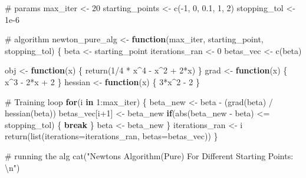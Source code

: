 \documentclass[
  letterpaper,
  DIV=11,
  numbers=noendperiod]{scrartcl}
\newenvironment{Shaded}{\begin{snugshade}}{\end{snugshade}}
\newcommand{\AttributeTok}[1]{\textcolor[rgb]{0.40,0.45,0.13}{#1}}
\newcommand{\CommentTok}[1]{\textcolor[rgb]{0.37,0.37,0.37}{#1}}
\newcommand{\ControlFlowTok}[1]{\textcolor[rgb]{0.00,0.23,0.31}{\textbf{#1}}}
\newcommand{\DecValTok}[1]{\textcolor[rgb]{0.68,0.00,0.00}{#1}}
\newcommand{\FloatTok}[1]{\textcolor[rgb]{0.68,0.00,0.00}{#1}}
\newcommand{\FunctionTok}[1]{\textcolor[rgb]{0.28,0.35,0.67}{#1}}
\newcommand{\NormalTok}[1]{\textcolor[rgb]{0.00,0.23,0.31}{#1}}
\newcommand{\OtherTok}[1]{\textcolor[rgb]{0.00,0.23,0.31}{#1}}
\newcommand{\SpecialCharTok}[1]{\textcolor[rgb]{0.37,0.37,0.37}{#1}}
\newcommand{\StringTok}[1]{\textcolor[rgb]{0.13,0.47,0.30}{#1}}
\begin{document}
\begin{Shaded}
\begin{Highlighting}[]
\CommentTok{\# params}
\NormalTok{max\_iter }\OtherTok{\textless{}{-}} \DecValTok{20}
\NormalTok{starting\_points }\OtherTok{\textless{}{-}} \FunctionTok{c}\NormalTok{(}\SpecialCharTok{{-}}\DecValTok{1}\NormalTok{, }\DecValTok{0}\NormalTok{, }\FloatTok{0.1}\NormalTok{, }\DecValTok{1}\NormalTok{, }\DecValTok{2}\NormalTok{)}
\NormalTok{stopping\_tol }\OtherTok{\textless{}{-}} \FloatTok{1e{-}6}


\CommentTok{\# algorithm}
\NormalTok{newton\_pure\_alg }\OtherTok{\textless{}{-}} \ControlFlowTok{function}\NormalTok{(max\_iter, starting\_point, stopping\_tol) \{}
\NormalTok{  beta }\OtherTok{\textless{}{-}}\NormalTok{ starting\_point}
\NormalTok{  iterations\_ran }\OtherTok{\textless{}{-}} \DecValTok{0}
\NormalTok{  betas\_vec }\OtherTok{\textless{}{-}} \FunctionTok{c}\NormalTok{(beta)}
  
\NormalTok{  obj }\OtherTok{\textless{}{-}} \ControlFlowTok{function}\NormalTok{(x) \{}
  \FunctionTok{return}\NormalTok{(}\DecValTok{1}\SpecialCharTok{/}\DecValTok{4} \SpecialCharTok{*}\NormalTok{ x}\SpecialCharTok{\^{}}\DecValTok{4} \SpecialCharTok{{-}}\NormalTok{ x}\SpecialCharTok{\^{}}\DecValTok{2} \SpecialCharTok{+} \DecValTok{2}\SpecialCharTok{*}\NormalTok{x)}
\NormalTok{  \}}
\NormalTok{  grad }\OtherTok{\textless{}{-}} \ControlFlowTok{function}\NormalTok{(x) \{}
\NormalTok{    x}\SpecialCharTok{\^{}}\DecValTok{3} \SpecialCharTok{{-}} \DecValTok{2}\SpecialCharTok{*}\NormalTok{x }\SpecialCharTok{+} \DecValTok{2}
\NormalTok{  \}}
\NormalTok{  hessian }\OtherTok{\textless{}{-}} \ControlFlowTok{function}\NormalTok{(x) \{}
    \DecValTok{3}\SpecialCharTok{*}\NormalTok{x}\SpecialCharTok{\^{}}\DecValTok{2} \SpecialCharTok{{-}} \DecValTok{2}
\NormalTok{  \}}
  
  \CommentTok{\# Training loop}
  \ControlFlowTok{for}\NormalTok{(i }\ControlFlowTok{in} \DecValTok{1}\SpecialCharTok{:}\NormalTok{max\_iter) \{}
\NormalTok{    beta\_new }\OtherTok{\textless{}{-}}\NormalTok{ beta }\SpecialCharTok{{-}}\NormalTok{ (}\FunctionTok{grad}\NormalTok{(beta) }\SpecialCharTok{/} \FunctionTok{hessian}\NormalTok{(beta))}
\NormalTok{    betas\_vec[i}\SpecialCharTok{+}\DecValTok{1}\NormalTok{] }\OtherTok{\textless{}{-}}\NormalTok{ beta\_new}
    \ControlFlowTok{if}\NormalTok{(}\FunctionTok{abs}\NormalTok{(beta\_new }\SpecialCharTok{{-}}\NormalTok{ beta) }\SpecialCharTok{\textless{}=}\NormalTok{ stopping\_tol) \{ }\ControlFlowTok{break}\NormalTok{ \}}
\NormalTok{    beta }\OtherTok{\textless{}{-}}\NormalTok{ beta\_new}
\NormalTok{  \}}
\NormalTok{  iterations\_ran }\OtherTok{\textless{}{-}}\NormalTok{ i}
  \FunctionTok{return}\NormalTok{(}\FunctionTok{list}\NormalTok{(}\AttributeTok{iterations=}\NormalTok{iterations\_ran, }\AttributeTok{betas=}\NormalTok{betas\_vec))}
\NormalTok{\}}

\CommentTok{\# running the alg}
\FunctionTok{cat}\NormalTok{(}\StringTok{"Newton\textquotesingle{}s Algorithm(Pure) For Different Starting Points: }\SpecialCharTok{\textbackslash{}n}\StringTok{"}\NormalTok{)}
\end{Highlighting}
\end{Shaded}
\end{document}
